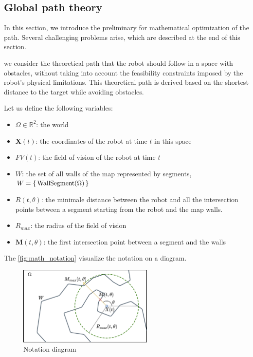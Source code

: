 \documentclass[../main.tex]{subfiles}
\begin{document}
\subsection{Global path theory}
In this section, we introduce the preliminary for mathematical optimization of the path. Several challenging problems arise, which are described at the end of this section.

we consider the theoretical path that the robot should follow in a space with obstacles, without taking into account the feasibility constraints imposed by the robot's physical limitations. This theoretical path is derived based on the shortest distance to the target while avoiding obstacles.

\vspace{1em}

Let us define the following variables:
\begin{itemize}
	\item $\Omega \in \mathbb{R}^{2}$: the world
	\item $\mathbf{X}(t)$: the coordinates of the robot at time $t$ in this space
	\item $FV(t)$: the field of vision of the robot at time $t$
	\item $W$: the set of all walls of the map represented by segments, $\displaystyle W = \left\{ \, \text{\rmfamily WallSegment} (\Omega)\, \right\}$
	\item $R(t, \theta)$: the minimale distance between the robot and all the intersection points between a segment  starting from the robot and the map walls.
	\item $R_{max}$: the radius of the field of vision
	\item $\mathbf{M}(t, \theta)$: the first intersection point between a segment and the walls
\end{itemize}


\vspace{0.5em}
The \autoref{fig:math_notation} visualize the notation on a diagram.
\begin{figure}[H]
	\centering
	\includegraphics[width=0.6\textwidth]{IMAGES/part3/math_nota.png}
	\caption{Notation diagram}
	\label{fig:math_notation}
\end{figure}
\end{document}
